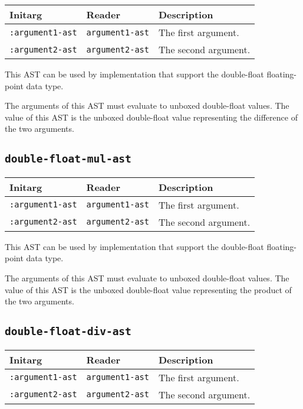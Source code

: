 \begin{tabular}{|l|l|l|}
\hline
Initarg & Reader & Description\\
\hline\hline
\texttt{:argument1-ast} & \texttt{argument1-ast} & The first argument.\\
\hline
\texttt{:argument2-ast} & \texttt{argument2-ast} & The second argument.\\
\hline
\end{tabular}

This AST can be used by implementation that support the double-float
floating-point data type.  

The arguments of this AST must evaluate to unboxed double-float
values.  The value of this AST is the unboxed double-float value
representing the difference of the two arguments.

\subsection{\texttt{double-float-mul-ast}}
\label{sec-ast-double-float-mul}

\begin{tabular}{|l|l|l|}
\hline
Initarg & Reader & Description\\
\hline\hline
\texttt{:argument1-ast} & \texttt{argument1-ast} & The first argument.\\
\hline
\texttt{:argument2-ast} & \texttt{argument2-ast} & The second argument.\\
\hline
\end{tabular}

This AST can be used by implementation that support the double-float
floating-point data type.  

The arguments of this AST must evaluate to unboxed double-float
values.  The value of this AST is the unboxed double-float value
representing the product of the two arguments.

\subsection{\texttt{double-float-div-ast}}
\label{sec-ast-double-float-div}

\begin{tabular}{|l|l|l|}
\hline
Initarg & Reader & Description\\
\hline\hline
\texttt{:argument1-ast} & \texttt{argument1-ast} & The first argument.\\
\hline
\texttt{:argument2-ast} & \texttt{argument2-ast} & The second argument.\\
\hline
\end{tabular}

